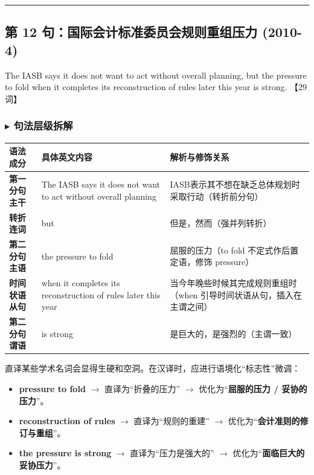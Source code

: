 \documentclass[cn,normal,11pt]{elegantnote}
\newcommand{\retrokey}[1]{{\color{accentcolor}\textbf{#1}}}
\begin{document}
\par\vspace{10pt}\hrule\vspace{10pt}

\subsection{第 12 句：国际会计标准委员会规则重组压力 (2010-4)}

\begin{note}
  The IASB says it does not want to act without overall planning, but the pressure to fold when it completes its reconstruction of rules later this year is strong. 【29 词】
\end{note}

\subsubsection*{$\blacktriangleright$ 句法层级拆解}
\noindent
\begin{tabularx}{\textwidth}{p{3.2cm} X X}
  \toprule
  \textbf{语法成分} & \textbf{具体英文内容} & \textbf{解析与修饰关系} \\
  \midrule
  \textbf{第一分句主干} & The IASB says it does not want to act without overall planning & IASB表示其不想在缺乏总体规划时采取行动（转折前分句） \\
  \midrule
  \textbf{转折连词} & but & 但是，然而（强并列转折） \\
  \midrule
  \textbf{第二分句主语} & the pressure to fold & 屈服的压力（to fold 不定式作后置定语，修饰 pressure） \\
  \midrule
  \textbf{时间状语从句} & when it completes its reconstruction of rules later this year & 当今年晚些时候其完成规则重组时（when 引导时间状语从句，插入在主谓之间） \\
  \midrule
  \textbf{第二分句谓语} & is strong & 是巨大的，是强烈的（主谓一致） \\
  \bottomrule
\end{tabularx}

\begin{proposition}[高阶学术英语的翻译微调与重组]
  直译某些学术名词会显得生硬和空洞。在汉译时，应进行语境化“标志性”微调：
  \begin{itemize}
    \item \textbf{pressure to fold} $\rightarrow$ 直译为“折叠的压力” $\rightarrow$ 优化为“\retrokey{屈服的压力 / 妥协的压力}”。
    \item \textbf{reconstruction of rules} $\rightarrow$ 直译为“规则的重建” $\rightarrow$ 优化为“\retrokey{会计准则的修订与重组}”。
    \item \textbf{the pressure is strong} $\rightarrow$ 直译为“压力是强大的” $\rightarrow$ 优化为“\retrokey{面临巨大的妥协压力}”。
  \end{itemize}
\end{proposition}
\end{document}
